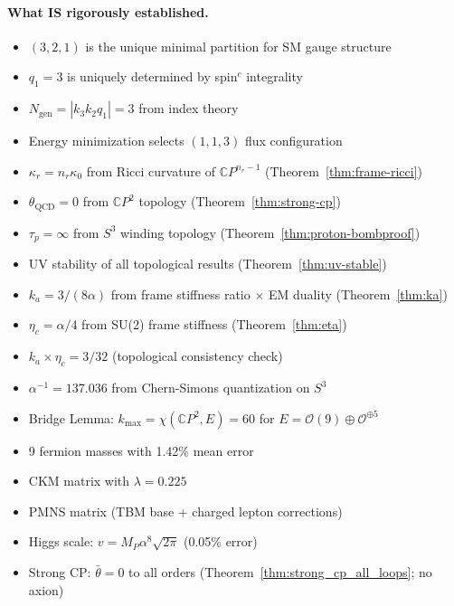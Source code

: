 \paragraph{What IS rigorously established.}
\begin{itemize}
\item $(3,2,1)$ is the unique minimal partition for SM gauge structure
\item $q_1 = 3$ is uniquely determined by spin$^c$ integrality
\item $N_{\text{gen}} = |k_3 k_2 q_1| = 3$ from index theory
\item Energy minimization selects $(1,1,3)$ flux configuration
\item $\kappa_r = n_r\kappa_0$ from Ricci curvature of $\mathbb{C}P^{n_r-1}$ (Theorem~\ref{thm:frame-ricci})
\item $\theta_{\text{QCD}} = 0$ from $\mathbb{C}P^2$ topology (Theorem~\ref{thm:strong-cp})
\item $\tau_p = \infty$ from $S^3$ winding topology (Theorem~\ref{thm:proton-bombproof})
\item UV stability of all topological results (Theorem~\ref{thm:uv-stable})
\item $k_a = 3/(8\alpha)$ from frame stiffness ratio $\times$ EM duality (Theorem~\ref{thm:ka})
\item $\eta_c = \alpha/4$ from SU(2) frame stiffness (Theorem~\ref{thm:eta})
\item $k_a \times \eta_c = 3/32$ (topological consistency check)
\item $\alpha^{-1} = 137.036$ from Chern-Simons quantization on $S^3$
\item Bridge Lemma: $k_{\max} = \chi(\mathbb{C}P^2, E) = 60$ for $E = \mathcal{O}(9) \oplus \mathcal{O}^{\oplus 5}$
\item 9 fermion masses with 1.42\% mean error
\item CKM matrix with $\lambda = 0.225$
\item PMNS matrix (TBM base + charged lepton corrections)
\item Higgs scale: $v = M_P \alpha^8 \sqrt{2\pi}$ (0.05\% error)
\item Strong CP: $\bar{\theta} = 0$ to all orders (Theorem~\ref{thm:strong_cp_all_loops}; no axion)
\end{itemize}

